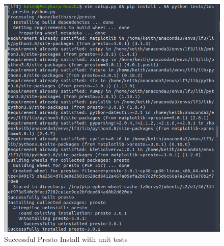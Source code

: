 \documentclass{article}
\begin{document}
\begin{figure}
	\includegraphics[width=\linewidth]{Images/PRESTO3_install.png}
	\caption{Successful Presto Install with unit tests}
	\label{fig:Presto-Install}  			
\end{figure}

\printbibliography
\end{document}
